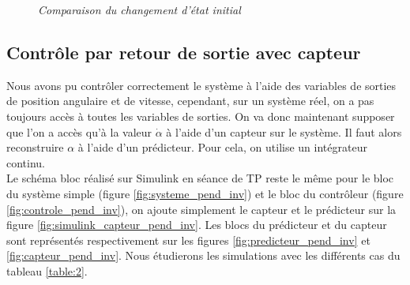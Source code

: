 \documentclass[11pt,french]{article} %
\begin{document}
\begin{figure}[H]%
    \centering
		\noindent{}%
		\caption{\textit{Comparaison du changement d'état initial}}%
		\label{fig:cas_5_6}%
\end{figure}
\vspace{0.5cm}




\subsection{Contrôle par retour de sortie avec capteur}

Nous avons pu contrôler correctement le système à l'aide des variables de sorties de position angulaire et de vitesse, cependant, sur un système réel, on a pas toujours accès à toutes les variables de sorties. On va donc maintenant supposer que l'on a accès qu'à la valeur $\dot\alpha$ à l'aide d'un capteur sur le système. Il faut alors reconstruire $\alpha$ à l'aide d'un prédicteur. Pour cela, on utilise un intégrateur continu. \\

Le schéma bloc réalisé sur Simulink en séance de TP reste le même pour le bloc du système simple (figure \ref{fig:systeme_pend_inv}) et le bloc du contrôleur (figure \ref{fig:controle_pend_inv}), on ajoute simplement le capteur et le prédicteur sur la figure \ref{fig:simulink_capteur_pend_inv}. Les blocs du prédicteur et du capteur sont représentés respectivement sur les figures \ref{fig:predicteur_pend_inv} et \ref{fig:capteur_pend_inv}. Nous étudierons les simulations avec les différents cas du tableau \ref{table:2}. \\
\end{document}
